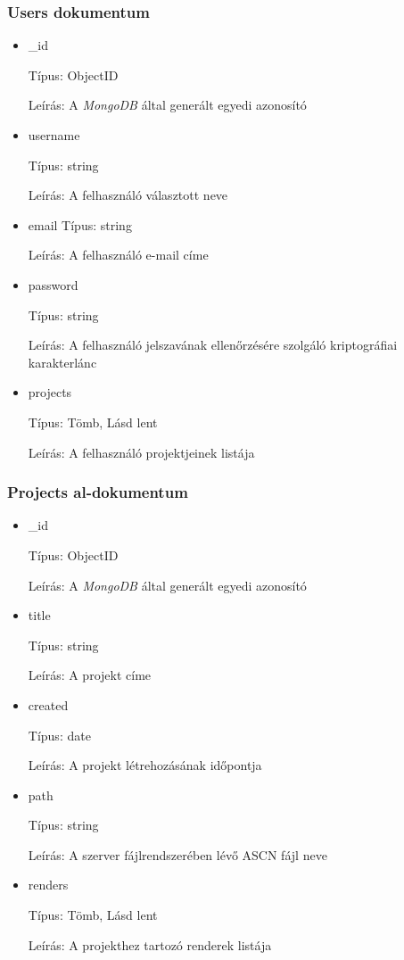 \pagebreak

\subsubsection{Users dokumentum}
\begin{itemize}
  \item \_id

        Típus: ObjectID

        Leírás: A \emph{MongoDB} által generált egyedi azonosító
  \item username

        Típus: string

        Leírás: A felhasználó választott neve
  \item email
        Típus: string

        Leírás: A felhasználó e-mail címe
  \item password

        Típus: string

        Leírás: A felhasználó jelszavának ellenőrzésére szolgáló kriptográfiai karakterlánc
  \item projects

        Típus: Tömb, Lásd lent

        Leírás: A felhasználó projektjeinek listája
\end{itemize}

\subsubsection{Projects al-dokumentum}

\begin{itemize}
  \item \_id

        Típus: ObjectID

        Leírás: A \emph{MongoDB} által generált egyedi azonosító
  \item title

        Típus: string

        Leírás: A projekt címe
  \item created

        Típus: date

        Leírás: A projekt létrehozásának időpontja
  \item path

        Típus: string

        Leírás: A szerver fájlrendszerében lévő ASCN fájl neve
  \item renders

        Típus: Tömb, Lásd lent

        Leírás: A projekthez tartozó renderek listája
\end{itemize}
